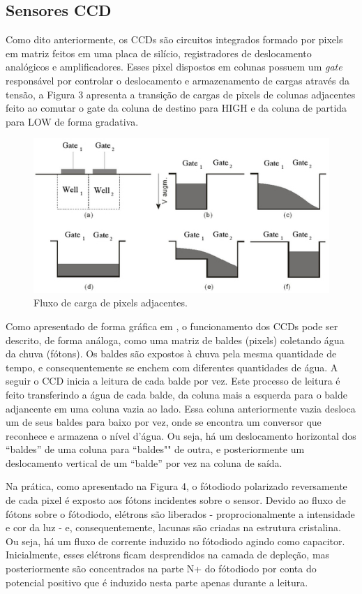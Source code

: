\documentclass[10pt,a4paper,twocolumn]{article}
\begin{document}
	\subsection*{Sensores CCD}
	Como dito anteriormente, os CCDs são circuitos integrados formado por pixels em matriz feitos em uma placa de silício, registradores de deslocamento analógicos e amplificadores. Esses pixel dispostos em colunas possuem um \textit{gate} responsável por controlar o deslocamento e armazenamento de cargas através da tensão, a Figura 3 apresenta a transição de cargas de pixels de colunas adjacentes feito ao comutar o gate da coluna de destino para HIGH e da coluna de partida para LOW de forma gradativa.
	
	\begin{figure}[!h]
		\centering
		\includegraphics[scale=0.5]{imagens/ccd.jpg}
		\caption{Fluxo de carga de pixels adjacentes.}
	\end{figure}
		
	Como apresentado de forma gráfica em \cite{Spectral}, o funcionamento dos CCDs pode ser descrito, de forma análoga, como uma matriz de baldes (pixels) coletando água da chuva (fótons). Os baldes são expostos à chuva pela mesma quantidade de tempo, e consequentemente se enchem com diferentes quantidades de água. A seguir o CCD inicia a leitura de cada balde por vez. Este processo de leitura é feito transferindo a água de cada balde, da coluna mais a esquerda para o balde adjancente em uma coluna vazia ao lado. Essa coluna anteriormente vazia desloca um de seus baldes para baixo por vez, onde se encontra um conversor que reconhece e armazena o nível d'água. Ou seja, há um deslocamento horizontal dos ``baldes'' de uma coluna para ``baldes"" de outra, e posteriormente um deslocamento vertical de um ``balde'' por vez na coluna de saída.
	
	Na prática, como apresentado na Figura 4, o fótodiodo polarizado reversamente de cada pixel é exposto aos fótons incidentes sobre o sensor. Devido ao fluxo de fótons sobre o fótodiodo, elétrons são liberados - proprocionalmente a intensidade e cor da luz - e, consequentemente, lacunas são criadas na estrutura cristalina. Ou seja, há um fluxo de corrente induzido no fótodiodo agindo como capacitor. Inicialmente, esses elétrons ficam desprendidos na camada de depleção, mas posteriormente são concentrados na parte N+ do fótodiodo por conta do potencial positivo que é induzido nesta parte apenas durante a leitura.
	
\end{document}
